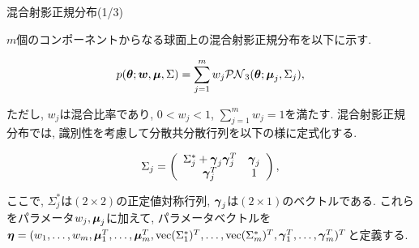\documentclass[dvipdfmx]{beamer} %
\newcommand{\bm}[1]{\mbox{\boldmath $#1$}}
\begin{document}
\begin{frame}{混合射影正規分布(1/3)}

$m$個のコンポーネントからなる球面上の混合射影正規分布を以下に示す. 

\vspace{-0.3cm}
\begin{eqnarray*}
\label{MPNS}
p(\bm \theta;\bm w,\bm \mu, \Sigma) = \sum^m_{j=1} w_j \mathcal{PN}_3(\bm \theta;\bm \mu_j, \Sigma_j),
\end{eqnarray*}

\noindent
ただし, $w_j$は混合比率であり, $0 < w_j < 1$, $\sum^m_{j=1} w_j = 1$を満たす. 混合射影正規分布では, 識別性を考慮して分散共分散行列を以下の様に定式化する. 

\vspace{-0.5cm}
\begin{eqnarray*}
\label{SIGMA}
 \Sigma_j = \left(
    \begin{array}{cc}
      \Sigma^*_j + \bm \gamma_j \bm \gamma_j^T & \bm \gamma_j \\
      \bm \gamma_j^T & 1
    \end{array}
  \right),
\end{eqnarray*}

\noindent
ここで, $\Sigma^*_j$は$(2 \times 2)$の正定値対称行列, $\bm \gamma_j$は$(2 \times 1)$のベクトルである. これらをパラメータ$w_j, \bm \mu_j$に加えて, パラメータベクトルを$\bm \eta = (w_1, \dots, w_m, \bm \mu_1^T, \dots, \bm \mu_m^T, \mbox{vec}(\Sigma^*_1)^T, \dots, \mbox{vec}(\Sigma^*_m)^T, \bm \gamma_1^T, \dots, \bm \gamma_m^T)^T$と定義する.

\end{frame}
\end{document}
